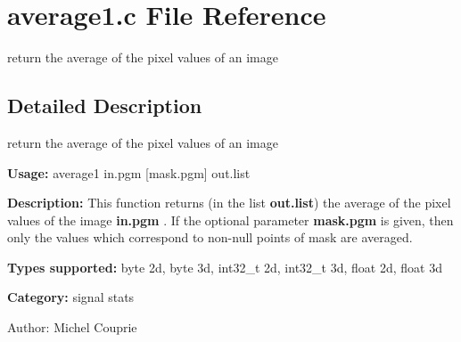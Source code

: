 \section{average1.c File Reference}
\label{average1_8c}
return the average of the pixel values of an image  




\label{_details}
\subsection{Detailed Description}
return the average of the pixel values of an image 

{\bf Usage:} average1 in.pgm [mask.pgm] out.list

{\bf Description:} This function returns (in the list {\bf out.list}) the average of the pixel values of the image {\bf in.pgm} . If the optional parameter {\bf mask.pgm} is given, then only the values which correspond to non-null points of mask are averaged.

{\bf Types supported:} byte 2d, byte 3d, int32\_\-t 2d, int32\_\-t 3d, float 2d, float 3d

{\bf Category:} signal stats

\begin{Desc}
\item[Author:]Michel Couprie \end{Desc}
